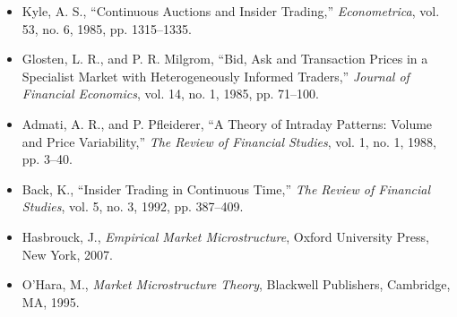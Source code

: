 \documentclass[11pt]{article}
\theoremstyle{remark}
\theoremstyle{definition}
\begin{document}
\begin{itemize}
    \item Kyle, A. S., ``Continuous Auctions and Insider Trading,'' \emph{Econometrica}, vol. 53, no. 6, 1985, pp. 1315--1335.
    \item Glosten, L. R., and P. R. Milgrom, ``Bid, Ask and Transaction Prices in a Specialist Market with Heterogeneously Informed Traders,'' \emph{Journal of Financial Economics}, vol. 14, no. 1, 1985, pp. 71--100.
    \item Admati, A. R., and P. Pfleiderer, ``A Theory of Intraday Patterns: Volume and Price Variability,'' \emph{The Review of Financial Studies}, vol. 1, no. 1, 1988, pp. 3--40.
    \item Back, K., ``Insider Trading in Continuous Time,'' \emph{The Review of Financial Studies}, vol. 5, no. 3, 1992, pp. 387--409.
    \item Hasbrouck, J., \emph{Empirical Market Microstructure}, Oxford University Press, New York, 2007.
    \item O'Hara, M., \emph{Market Microstructure Theory}, Blackwell Publishers, Cambridge, MA, 1995.
\end{itemize}
\end{document}
